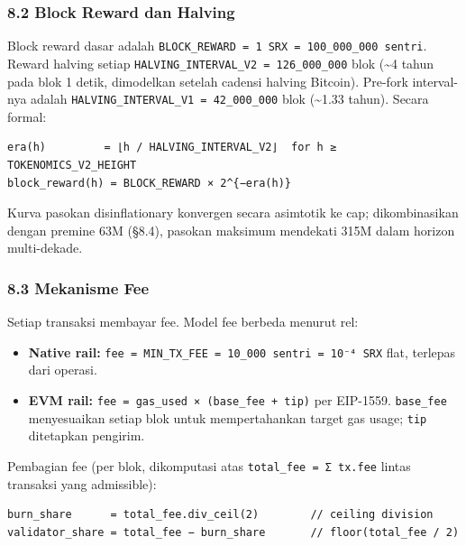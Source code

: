 \documentclass[11pt,a4paper]{article}
\providecommand{\tightlist}{\setlength{\itemsep}{0pt}\setlength{\parskip}{0pt}}
\begin{document}
\hypertarget{block-reward-dan-halving}{%
\subsubsection{8.2 Block Reward dan Halving}\label{block-reward-dan-halving}}

Block reward dasar adalah \texttt{BLOCK\_REWARD\ =\ 1\ SRX\ =\ 100\_000\_000\ sentri}. Reward halving setiap \texttt{HALVING\_INTERVAL\_V2\ =\ 126\_000\_000} blok (\textasciitilde4 tahun pada blok 1 detik, dimodelkan setelah cadensi halving Bitcoin). Pre-fork interval-nya adalah \texttt{HALVING\_INTERVAL\_V1\ =\ 42\_000\_000} blok (\textasciitilde1.33 tahun). Secara formal:

\begin{verbatim}
era(h)         = ⌊h / HALVING_INTERVAL_V2⌋  for h ≥ TOKENOMICS_V2_HEIGHT
block_reward(h) = BLOCK_REWARD × 2^{−era(h)}
\end{verbatim}

Kurva pasokan disinflationary konvergen secara asimtotik ke cap; dikombinasikan dengan premine 63M (§8.4), pasokan maksimum mendekati 315M dalam horizon multi-dekade.

\hypertarget{mekanisme-fee}{%
\subsubsection{8.3 Mekanisme Fee}\label{mekanisme-fee}}

Setiap transaksi membayar fee. Model fee berbeda menurut rel:

\begin{itemize}
\tightlist
\item
  \textbf{Native rail:} \texttt{fee\ =\ MIN\_TX\_FEE\ =\ 10\_000\ sentri\ =\ 10⁻⁴\ SRX} flat, terlepas dari operasi.
\item
  \textbf{EVM rail:} \texttt{fee\ =\ gas\_used\ ×\ (base\_fee\ +\ tip)} per EIP-1559. \texttt{base\_fee} menyesuaikan setiap blok untuk mempertahankan target gas usage; \texttt{tip} ditetapkan pengirim.
\end{itemize}

Pembagian fee (per blok, dikomputasi atas \texttt{total\_fee\ =\ Σ\ tx.fee} lintas transaksi yang admissible):

\begin{verbatim}
burn_share      = total_fee.div_ceil(2)        // ceiling division
validator_share = total_fee − burn_share       // floor(total_fee / 2)
\end{verbatim}
\end{document}
